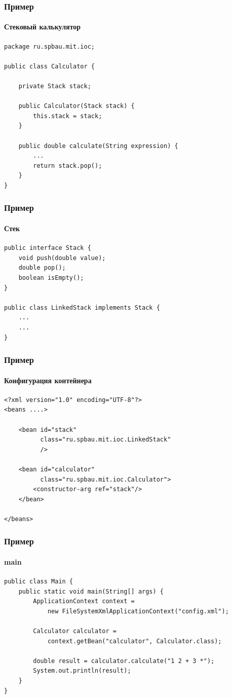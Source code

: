 \documentclass[xetex,mathserif,serif]{beamer}
\begin{document}
	\begin{frame}[fragile]
		\frametitle{Пример}
		\framesubtitle{Стековый калькулятор}
		\begin{small}
			\begin{verbatim}
package ru.spbau.mit.ioc;

public class Calculator {

    private Stack stack;

    public Calculator(Stack stack) {
        this.stack = stack;
    }

    public double calculate(String expression) {
        ...
        return stack.pop();
    }
}
			\end{verbatim}
		\end{small}
	\end{frame}

	\begin{frame}[fragile]
		\frametitle{Пример}
		\framesubtitle{Стек}
		\begin{verbatim}
public interface Stack {
    void push(double value);
    double pop();
    boolean isEmpty();
}

public class LinkedStack implements Stack {
    ...
    ...
}
		\end{verbatim}
	\end{frame}

	\begin{frame}[fragile]
		\frametitle{Пример}
		\framesubtitle{Конфигурация контейнера}
		\begin{verbatim}
<?xml version="1.0" encoding="UTF-8"?>
<beans ....>

    <bean id="stack"
          class="ru.spbau.mit.ioc.LinkedStack"
          />

    <bean id="calculator"
          class="ru.spbau.mit.ioc.Calculator">
        <constructor-arg ref="stack"/>
    </bean>

</beans>
		\end{verbatim}
	\end{frame}

	\begin{frame}[fragile]
		\frametitle{Пример}
		\framesubtitle{main}
		\begin{verbatim}
public class Main {
    public static void main(String[] args) {
        ApplicationContext context = 
            new FileSystemXmlApplicationContext("config.xml");

        Calculator calculator = 
            context.getBean("calculator", Calculator.class);

        double result = calculator.calculate("1 2 + 3 *");
        System.out.println(result);
    }
}
		\end{verbatim}
	\end{frame}
\end{document}
